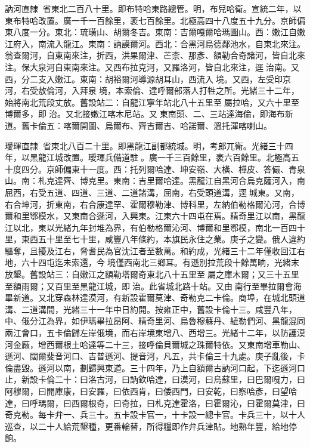 \begin{pinyinscope}
訥河直隸：省東北二百八十里。即布特哈東路總管。明，布兒哈衛。宣統二年，以東布特哈改置。廣一千一百餘里，袤七百餘里。北極高四十八度五十九分。京師偏東八度一分。東北：琉璜山、胡爾冬吉。東南：吉爾嘎爾哈瑪圖山。西：嫩江自嫩江府入，南流入龍江。東南：訥謨爾河。西北：合黑河烏德鄰池水，自東北來注。翁查爾河，自東南來注，折西，洪果爾津、芒柰、那彥、額勒合奇諸河，皆自北來注。保大泉河自東南來注。又西布拉克河，又羅洛河，皆自北來注，逕治南。又西，分二支入嫩江。東南：胡裕爾河導源胡耳山，西流入境。又西，左受印京河，右受敖倫河，入拜泉境，本索倫、達呼爾部落人打牲之所。光緒三十二年，始將南北荒段丈放。舊設站二：自龍江寧年站北八十五里至屬拉哈，又六十里至博爾多，即治。又北接嫩江喀木尼站。又東南頭、二、三站達海倫，即海布新道。舊卡倫五：喀爾開圖、烏爾布、齊吉爾吉、哈諾爾、溫托渾喀喇山。

璦琿直隸：省東北八百二十里。即黑龍江副都統城。明，考郎兀衛。光緒三十四年，以黑龍江城改置。璦琿兵備道駐。廣一千三百餘里，袤六百餘里。北極高五十度四分。京師偏東十一度。西：托列爾哈達、坤安嶺、大橫、樺皮、答儼、青泉山。南：札克達齊、博克里。東南：吉里爾哈達。黑龍江自黑河合烏克薩河入，南屈西，右受五道、四道、三道、二道諸溝，屈南，右受頭道溝，逕城東。又南，右合坤河，折東南，右合康達罕、霍爾穆勒津、博科里，左納伯勒格爾沁河，合博爾和里鄂模水，又東南合遜河，入興東。江東六十四屯在焉。精奇里江以南，黑龍江以北，東以光緒九年封堆為界，有伯勒格爾沁河、博爾和里鄂模，南北一百四十里，東西五十里至七十里，咸豐八年條約，本旗民永住之業。庚子之變。俄人違約驅奪，且擾及江右，脅耆民為官沈江者至數萬。和約成，光緒三十二年僅收回江右地，六十四屯迄未索還，今境僅西南北三鄉耳。有遜別拉荒段十餘萬晌，光緒末放墾。舊設站三：自嫩江之額勒塔爾奇東北八十五里至屬之庫木爾；又三十五里至額雨爾；又百里至黑龍江城，即治。此省城北路十站。又由南行至畢拉爾會海畢新道。又北穿森林達漠河，有新設霍爾莫津、奇勒克二卡倫。商埠，在城北頭道溝、二道溝間，光緒三十一年中日約開。按雍正中，舊設卡倫十三。咸豐八年，中、俄分江為界，如伊瑪畢拉昂阿、精奇里河、烏魯穆蘇丹、紐勒們河、黑龍混同兩江會口，五卡倫歸左岸俄境，而右岸境東增八、西增三。光緒十二年，以防護漠河金廠，增西爾根土哈達等二十三，接呼倫貝爾城之珠爾特依。又東南增車勒山、遜河、闊爾斐音河口、吉普遜河、提音河，凡五，共卡倫三十九處。庚子亂後，卡倫盡毀。遜河以南，劃歸興東道。三十四年，乃上自額爾古訥河口起，下迄遜河口止，新設卡倫二十：曰洛古河，曰訥欽哈達，曰漠河，曰烏蘇里，曰巴爾嘎力，曰阿穆爾，曰開庫康，曰安羅，曰依西肯，曰倭西門，曰安乾，曰察哈彥，曰望哈達，曰呼瑪爾，曰西爾根奇，曰奇拉，曰札克達霍洛，曰霍爾沁，曰霍爾莫津，曰奇克勒。每卡弁一、兵三十。五卡設卡官一，十卡設一總卡官。卡兵三十，以十人巡查，以二十人給荒墾種，更番輪替，所得糧即作弁兵津貼。地熟年豐，給地停餉。


\end{pinyinscope}
